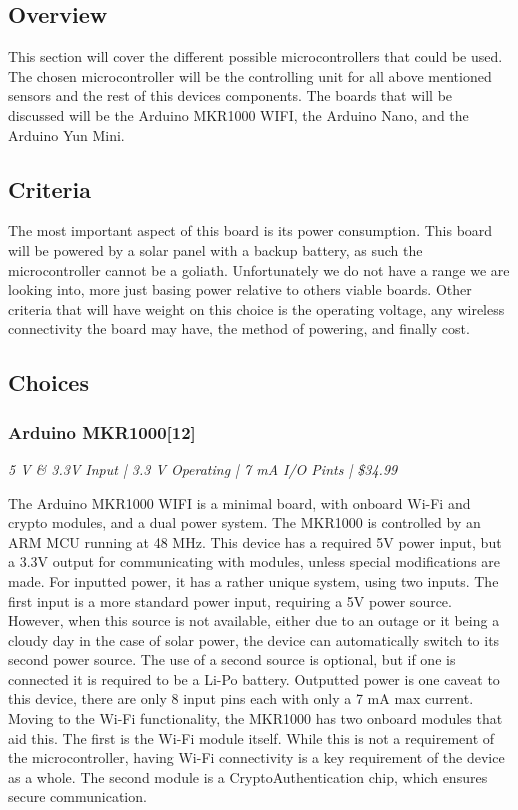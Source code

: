 \documentclass[IEEEtran,letterpaper,10pt,titlepage,fleqn,draftclsnofoot,onecolumn]{article}
\begin{document}
\subsection{Overview}

This section will cover the different possible microcontrollers that could be used. The chosen microcontroller will be the controlling unit for all above mentioned sensors and the rest of this devices components. The boards that will be discussed will be the Arduino MKR1000 WIFI, the Arduino Nano, and the Arduino Yun Mini.

\subsection{Criteria}

The most important aspect of this board is its power consumption. This board will be powered by a solar panel with a backup battery, as such the microcontroller cannot be a goliath. Unfortunately we do not have a range we are looking into, more just basing power relative to others viable boards. Other criteria that will have weight on this choice is the operating voltage, any wireless connectivity the board may have, the method of powering, and finally cost.

\clearpage

\subsection{Choices}
\subsubsection{Arduino MKR1000[12]}
\textit{5 V \& 3.3V Input | 3.3 V Operating | 7 mA I/O Pints | \$34.99}

\vspace{1mm}

The Arduino MKR1000 WIFI is a minimal board, with onboard Wi-Fi and crypto modules, and a dual power system. The MKR1000 is controlled by an ARM MCU running at 48 MHz. This device has a required 5V power input, but a 3.3V output for communicating with modules, unless special modifications are made. For inputted power, it has a rather unique system, using two inputs. The first input is a more standard power input, requiring a 5V power source. However, when this source is not available, either due to an outage or it being a cloudy day in the case of solar power, the device can automatically switch to its second power source. The use of a second source is optional, but if one is connected it is required to be a Li-Po battery. Outputted power is one caveat to this device, there are only 8 input pins each with only a 7 mA max current. Moving to the Wi-Fi functionality, the MKR1000 has two onboard modules that aid this. The first is the Wi-Fi module itself. While this is not a requirement of the microcontroller, having Wi-Fi connectivity is a key requirement of the device as a whole. The second module is a CryptoAuthentication chip, which ensures secure communication. 
\end{document}
